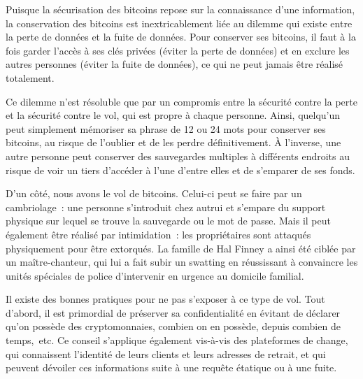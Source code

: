 Puisque la sécurisation des bitcoins repose sur la connaissance d'une information, la conservation des bitcoins est inextricablement liée au dilemme qui existe entre la perte de données et la fuite de données. Pour conserver ses bitcoins, il faut à la fois garder l'accès à ses clés privées (éviter la perte de données) et en exclure les autres personnes (éviter la fuite de données), ce qui ne peut jamais être réalisé totalement.

Ce dilemme n'est résoluble que par un compromis entre la sécurité contre la perte et la sécurité contre le vol, qui est propre à chaque personne. Ainsi, quelqu'un peut simplement mémoriser sa phrase de 12 ou 24 mots pour conserver ses bitcoins, au risque de l'oublier et de les perdre définitivement. À l'inverse, une autre personne peut conserver des sauvegardes multiples à différents endroits au risque de voir un tiers d'accéder à l'une d'entre elles et de s'emparer de ses fonds.

D'un côté, nous avons le vol de bitcoins. Celui-ci peut se faire par un cambriolage~: une personne s'introduit chez autrui et s'empare du support physique sur lequel se trouve la sauvegarde ou le mot de passe. Mais il peut également être réalisé par intimidation~: les propriétaires sont attaqués physiquement pour être extorqués. La famille de Hal Finney a ainsi été ciblée par un maître-chanteur, qui lui a fait subir un swatting en réussissant à convaincre les unités spéciales de police d'intervenir en urgence au domicile familial.

Il existe des bonnes pratiques pour ne pas s'exposer à ce type de vol. Tout d'abord, il est primordial de préserver sa confidentialité en évitant de déclarer qu'on possède des cryptomonnaies, combien on en possède, depuis combien de temps,~etc. Ce conseil s'applique également vis-à-vis des plateformes de change, qui connaissent l'identité de leurs clients et leurs adresses de retrait, et qui peuvent dévoiler ces informations suite à une requête étatique ou à une fuite.

